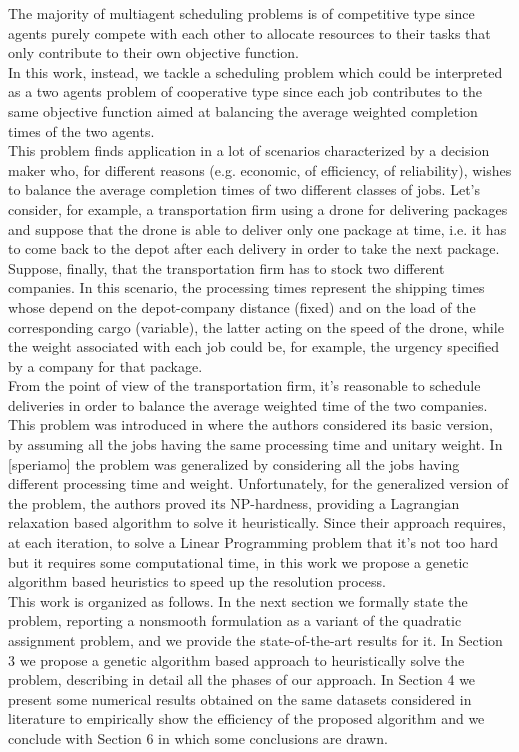 \documentclass[opre,nonblindrev]{informs3} %
\begin{document}
 The majority of multiagent scheduling problems is of competitive type since agents purely compete with each other to allocate resources to their tasks that only contribute to their own objective function.\\ In this work, instead, we tackle a scheduling problem which could be interpreted as a two agents problem of cooperative type since each job contributes to the same objective function aimed at balancing the average weighted completion times of the two agents.\\
This problem finds application in a lot of scenarios characterized by a decision maker who, for different reasons (e.g. economic, of efficiency, of reliability), wishes to balance the average completion times of two different classes of jobs. Let’s consider, for example, a transportation firm using a drone for delivering packages and suppose that the drone is able to deliver only one package at time, i.e. it has to come back to the depot after each delivery in order to take the next package. Suppose, finally, that the transportation firm has to stock two different companies. In this scenario, the processing times represent the shipping times whose depend on the depot-company distance (fixed) and on the load of the corresponding cargo (variable), the latter acting on the speed of the drone, while the weight associated with each job could be, for example, the urgency specified by a company for that package.\\ From the point of view of the transportation firm, it’s reasonable to schedule deliveries in order to balance the average weighted time of the two companies. \\
This problem was introduced in \cite{av-fud20} where the authors considered its basic version, by assuming all the jobs having the same processing time and unitary weight. In [speriamo] the problem was generalized by considering all the jobs having different processing time and weight. Unfortunately, for the generalized version of the problem, the authors proved its NP-hardness, providing a Lagrangian relaxation based algorithm to solve it heuristically. Since their approach requires, at each iteration, to solve a Linear Programming problem that it's not too hard but it requires some computational time, in this work we propose a genetic algorithm based heuristics to speed up the resolution process.\\
This work is organized as follows. In the next section we formally state the problem, reporting a nonsmooth formulation as a variant of the quadratic assignment problem, and we provide the state-of-the-art results for it. In Section 3 we propose a genetic algorithm based approach to heuristically solve the problem, describing in detail all the phases of our approach. In Section 4 we present some numerical results obtained on the same datasets considered in literature to empirically show the efficiency of the proposed algorithm and we conclude with Section 6 in which some conclusions are drawn.
\end{document}
